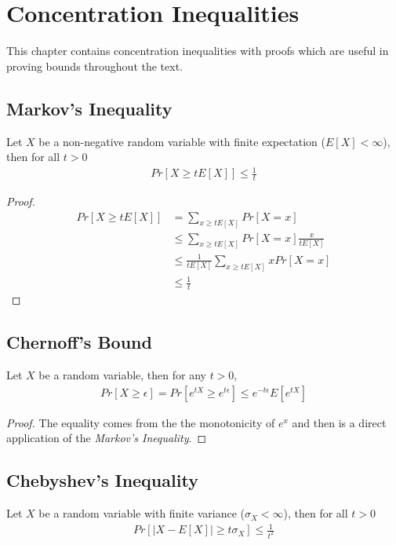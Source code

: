 \documentclass[../main]{subfiles}
\begin{document}
\chapter{Concentration Inequalities}

This chapter contains concentration inequalities with proofs which are useful in proving
bounds throughout the text.

\section{Markov's Inequality}

\begin{theorem} \label{th:markov_inq}
Let $X$ be a non-negative random variable with finite expectation ($E[X] < \infty$), then
for all $t>0$
\begin{align}
Pr\left[X \geq tE[X]\right] \leq \frac{1}{t}
\end{align}
\begin{proof}
\begin{align}
Pr\left[X \geq tE[X]\right] &= \sum_{x \geq tE[X]} Pr[X = x] \nonumber \\
&\leq \sum_{x \geq tE[X]} Pr[X = x] \frac{x}{tE[X]} \tag{by definition $x \geq tE[X]$} \\
&\leq \frac{1}{tE[X]} \sum_{x \geq tE[X]} xPr[X = x] \nonumber \\
&\leq \frac{1}{t}
\end{align}
\end{proof}
\end{theorem}

\section{Chernoff's Bound}

\begin{theorem} \label{th:chernoff_bound}
Let $X$ be a random variable, then for any $t>0$,
\begin{align}
Pr[X \geq \epsilon] = Pr[e^{tX} \geq e^{t\epsilon}] \leq e^{-t\epsilon} E[e^{tX}]
\end{align}
\end{theorem}

\begin{proof}
The equality comes from the the monotonicity of $e^x$ and then is a direct application
of the \textit{Markov's Inequality}.
\end{proof}

\section{Chebyshev's Inequality}
\begin{theorem} \label{th:chebyshev_inq}
Let $X$ be a random variable with finite variance ($\sigma_X < \infty$), then for all $t>0$
\begin{align}
Pr\left[ |X-E[X]| \geq t\sigma_X \right] \leq \frac{1}{t^2}
\end{align}
\end{theorem}
\end{document}
